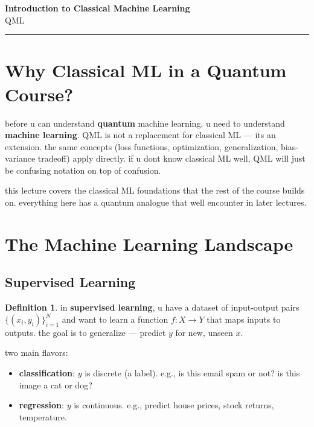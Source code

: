 \documentclass[11pt,a4paper]{article}
\theoremstyle{definition}
\newtheorem{definition}{Definition}[section]
\theoremstyle{remark}
\begin{document}
\begin{center}
    {\LARGE \textbf{Introduction to Classical Machine Learning}}\\[8pt]
    {\large QML}\\[12pt]
    \hrule
\end{center}

\vspace{12pt}
\tableofcontents
\newpage

\section{Why Classical ML in a Quantum Course?}

before u can understand \textbf{quantum} machine learning, u need to understand \textbf{machine learning}. QML is not a replacement for classical ML --- its an extension. the same concepts (loss functions, optimization, generalization, bias-variance tradeoff) apply directly. if u dont know classical ML well, QML will just be confusing notation on top of confusion.

this lecture covers the classical ML foundations that the rest of the course builds on. everything here has a quantum analogue that well encounter in later lectures.

\section{The Machine Learning Landscape}

\subsection{Supervised Learning}

\begin{definition}
in \textbf{supervised learning}, u have a dataset of input-output pairs $\{(x_i, y_i)\}_{i=1}^N$ and want to learn a function $f: X \to Y$ that maps inputs to outputs. the goal is to generalize --- predict $y$ for new, unseen $x$.
\end{definition}

two main flavors:
\begin{itemize}
    \item \textbf{classification}: $y$ is discrete (a label). e.g., is this email spam or not? is this image a cat or dog?
    \item \textbf{regression}: $y$ is continuous. e.g., predict house prices, stock returns, temperature.
\end{itemize}
\end{document}
